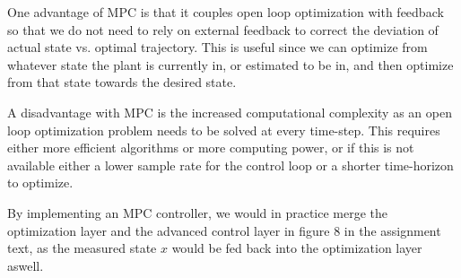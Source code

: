 One advantage of MPC is that it couples open loop optimization with feedback so that we do not need to rely on external feedback to correct the deviation of actual state vs. optimal trajectory. This is useful since we can optimize from whatever state the plant is currently in, or estimated to be in, and then optimize from that state towards the desired state.

A disadvantage with MPC is the increased computational complexity as an open loop optimization problem needs to be solved at every time-step. This requires either more efficient algorithms or more computing power, or if this is not available either a lower sample rate for the control loop or a shorter time-horizon to optimize.

By implementing an MPC controller, we would in practice merge the optimization layer and the advanced control layer in figure 8 in the assignment text, as the measured state $x$ would be fed back into the optimization layer aswell.









